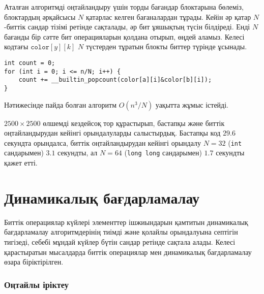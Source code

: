 Аталған алгоритмді оңтайландыру үшін торды бағандар блоктарына бөлеміз,
блоктардың әрқайсысы $N$ қатарлас келген бағаналардан тұрады. Кейін әр қатар $N$-биттік сандар тізімі ретінде сақталады, әр бит ұяшықтың түсін білдіреді.
Енді $N$ бағанды бір сәтте бит операцияларын қолдана отырып, 
өңдей аламыз. Келесі кодтағы $\texttt{color}[y][k]$
$N$ түстерден тұратын блокты биттер түрінде ұсынады.
\begin{lstlisting}
int count = 0;
for (int i = 0; i <= n/N; i++) {
    count += __builtin_popcount(color[a][i]&color[b][i]);
}
\end{lstlisting}
Нәтижесінде пайда болған алгоритм $O(n^3/N)$ уақытта 
жұмыс істейді.

$2500 \times 2500$ өлшемді кездейсоқ тор құрастырып, 
бастапқы және биттік оңтайландырудан кейінгі орындалуларды 
салыстырдық. Бастапқы код $29.6$ секундта орындалса, 
биттік оңтайландырудан кейінгі орындалу $N=32$ (\texttt{int} сандарымен)
$3.1$ секундты, ал $N=64$ (\texttt{long long} сандарымен) $1.7$ секундты 
қажет етті.

\section{Динамикалық бағдарламалау}

Биттік операциялар күйлері элементтер ішжиындарын қамтитын 
динамикалық бағдарламалау алгоритмдерінің
тиімді және қолайлы орындалуына септігін тигізеді,
себебі мұндай күйлер бүтін сандар ретінде сақтала алады.
Келесі қарастыратын мысалдарда биттік операциялар мен 
динамикалық бағдарламалау өзара біріктірілген.

\subsubsection{Оңтайлы іріктеу}

